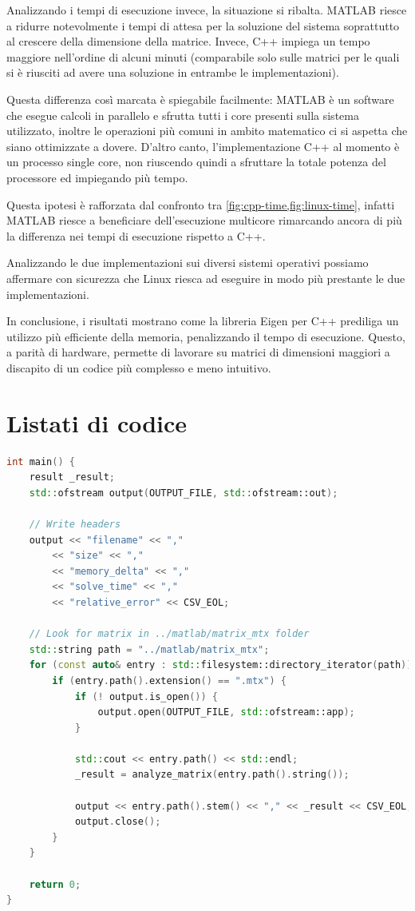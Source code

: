 \documentclass[11pt,italian]{article}
\begin{document}
\smallskip
Analizzando i tempi di esecuzione invece, la situazione si ribalta. MATLAB riesce a ridurre notevolmente i tempi di attesa per la soluzione del sistema soprattutto al crescere della dimensione della matrice.
Invece, C++ impiega un tempo maggiore nell'ordine di alcuni minuti (comparabile solo sulle matrici per le quali si è riusciti ad avere una soluzione in entrambe le implementazioni).

Questa differenza così marcata è spiegabile facilmente: MATLAB è un software che esegue calcoli in parallelo e sfrutta tutti i core presenti sulla sistema utilizzato, inoltre le operazioni più comuni in ambito matematico ci si aspetta che siano ottimizzate a dovere.
D'altro canto, l'implementazione C++ al momento è un processo single core, non riuscendo quindi a sfruttare la totale potenza del processore ed impiegando più tempo.

Questa ipotesi è rafforzata dal confronto tra \cref{fig:cpp-time,fig:linux-time}, infatti MATLAB riesce a beneficiare dell'esecuzione multicore rimarcando ancora di più la differenza nei tempi di esecuzione rispetto a C++.

\smallskip
Analizzando le due implementazioni sui diversi sistemi operativi possiamo affermare con sicurezza che Linux riesca ad eseguire in modo più prestante le due implementazioni.

\smallskip
In conclusione, i risultati mostrano come la libreria Eigen per C++ prediliga un utilizzo più efficiente della memoria, penalizzando il tempo di esecuzione. Questo, a parità di hardware, permette di lavorare su matrici di dimensioni maggiori a discapito di un codice più complesso e meno intuitivo.

\newpage
\section{Listati di codice}
\label{section:code}
\begin{lstlisting}[language=C++,emph={std},basicstyle=\footnotesize\ttfamily,caption=Main dell'implementazione C++]
int main() {
    result _result;
    std::ofstream output(OUTPUT_FILE, std::ofstream::out);

    // Write headers
    output << "filename" << ","
        << "size" << ","
        << "memory_delta" << ","
        << "solve_time" << ","
        << "relative_error" << CSV_EOL;

    // Look for matrix in ../matlab/matrix_mtx folder
    std::string path = "../matlab/matrix_mtx";
    for (const auto& entry : std::filesystem::directory_iterator(path)) {
        if (entry.path().extension() == ".mtx") {
            if (! output.is_open()) {
                output.open(OUTPUT_FILE, std::ofstream::app);
            }

            std::cout << entry.path() << std::endl;
            _result = analyze_matrix(entry.path().string());

            output << entry.path().stem() << "," << _result << CSV_EOL;
            output.close();
        }
    }

    return 0;
}
\end{lstlisting}
\end{document}
